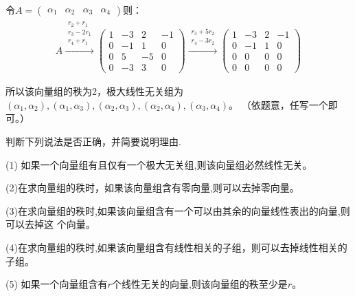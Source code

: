 \documentclass[a4paper]{report}
\begin{document}
\begin{jie}
令$A=
\begin{pmatrix}
\alpha_1& \alpha_2& \alpha_3& \alpha_4
\end{pmatrix}
$则：
\begin{align*}
A\xrightarrow{\substack{r_{2}+r_1 \\ r_3-2r_1\\ r_4+r_1}}{
\begin{pmatrix}
1&-3&2&-1\\ 0&-1&1&0\\ 0&5&-5&0\\ 0&-3&3&0
\end{pmatrix}
}\xrightarrow{\substack{r_{3}+5r_2 \\ r_4-3r_2}}{
\begin{pmatrix}
1&-3&2&-1\\ 0&-1&1&0\\ 0&0&0&0\\ 0&0&0&0
\end{pmatrix}
}
\end{align*}

所以该向量组的秩为2，极大线性无关组为
$(\alpha_1,\alpha_2),(\alpha_1,\alpha_3),(\alpha_2,\alpha_3),(\alpha_2,\alpha_4),(\alpha_3,\alpha_4)$。 （依题意，任写一个即可。）
\end{jie}

\EX 判断下列说法是否正确，并简要说明理由.

(1) 如果一个向量组有且仅有一个极大无关组,则该向量组必然线性无关。

(2)在求向量组的秩时，如果该向量组含有零向量,则可以去掉零向量。

(3)在求向量组的秩时,如果该向量组含有一个可以由其余的向量线性表出的向量,则可以去掉这
个向量。

(4)在求向量组的秩时,如果该向量组含有线性相关的子组，则可以去掉线性相关的子组。

(5) 如果一个向量组含有$r$个线性无关的向量,则该向量组的秩至少是$r$。
\end{document}
